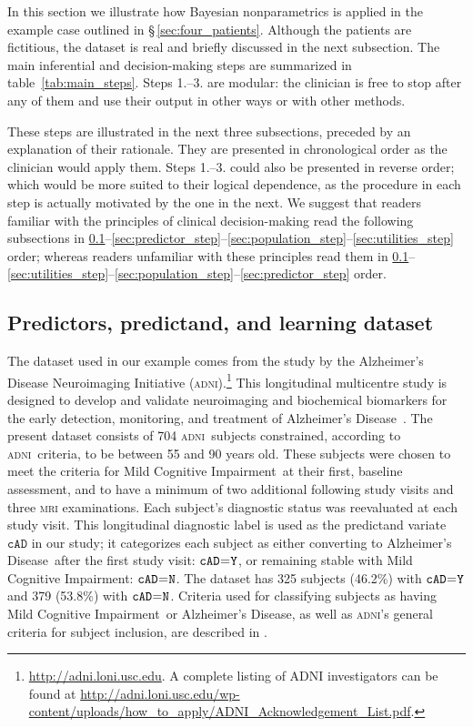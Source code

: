 \documentclass[a4paper,12pt,%
onecolumn,oneside,article,%
british%
]{memoir}
\theoremstyle{remark}
\theoremstyle{innote}
\renewcommand*{\|}[1][]{\nonscript\:#1\vert\nonscript\:\mathopen{}}
\newcommand*{\mo}[1][=]{\mathclose{}\mathord{\nonscript\mkern0.5mu#1\nonscript\mkern0.5mu}\mathopen{}}
\newcommand*{\sect}{\S}%
\newcommand*{\cad}{\texttt{cAD}}
\newcommand*{\yes}{\texttt{Y}}
\newcommand*{\no}{\texttt{N}}
\newcommand*{\ad}{Alzheimer's Disease}
\newcommand*{\mci}{Mild Cognitive Impairment}
\newcommand*{\adni}{\textsc{adni}}
\begin{document}
In this section we illustrate how Bayesian nonparametrics is applied in the example case outlined in \sect\,\ref{sec:four_patients}. Although the patients are fictitious, the dataset is real and briefly discussed in the next subsection. The main inferential and decision-making steps are summarized in table~\ref{tab:main_steps}.
Steps 1.--3. are modular: the clinician is free to stop after any of them and use their output in other ways or with other methods.


These steps are illustrated in the next three subsections, preceded by an explanation of their rationale. They are presented in chronological order as the clinician would apply them. %
Steps 1.--3. could also be presented in reverse order; which would be more suited to their logical dependence, as the procedure in each step is actually motivated by the one in the next. We suggest that readers familiar with the principles of clinical decision-making read the following subsections in \ref{sec:dataset}--\ref{sec:predictor_step}--\ref{sec:population_step}--\ref{sec:utilities_step} order; whereas readers unfamiliar with these principles read them in \ref{sec:dataset}--\ref{sec:utilities_step}--\ref{sec:population_step}--\ref{sec:predictor_step} order.


\setcounter{subsection}{-1}
\subsection{Predictors, predictand, and learning dataset}
\label{sec:dataset}

The dataset used in our example comes from the study by the Alzheimer's Disease Neuroimaging Initiative (\adni).\footnote{\url{http://adni.loni.usc.edu}. A complete listing of ADNI investigators can be found at \url{http://adni.loni.usc.edu/wp-content/uploads/how\_to\_apply/ADNI\_Acknowledgement\_List.pdf}.} This longitudinal multicentre study is designed to develop and validate neuroimaging and biochemical biomarkers for the early detection, monitoring, and treatment of \ad\ \autocites{petersenetal2010}. The present dataset consists of 704 \adni\ subjects constrained, according to \adni\ criteria, to be between 55 and 90 years old. These subjects were chosen to meet the criteria for \mci\ at their first, baseline assessment, and to have a minimum of two additional following study visits and three \textsc{mri} examinations. Each subject's diagnostic status was reevaluated at each study visit. This longitudinal diagnostic label is used as the predictand variate $\cad$ in our study; it categorizes each subject as either converting to \ad\ after the first study visit: $\cad\mo\yes$, or remaining stable with \mci: $\cad\mo\no$. The dataset has 325 subjects (46.2\%) with $\cad\mo\yes$ and 379 (53.8\%) with $\cad\mo\no$. Criteria used for classifying subjects as having \mci\ or \ad, as well as \adni's general criteria for subject inclusion, are described in \autocites{mckhannetal1984,petersenetal2010}.
\end{document}
